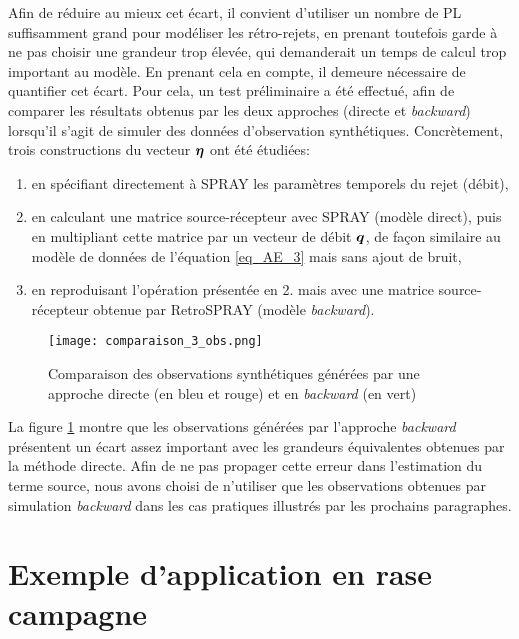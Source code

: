 Afin de réduire au mieux cet écart, il convient d'utiliser un nombre de PL suffisamment grand pour modéliser les rétro-rejets, en prenant toutefois garde à ne pas choisir une grandeur trop élevée, qui demanderait un temps de calcul trop important au modèle. En prenant cela en compte, il demeure nécessaire de quantifier cet écart. Pour cela, un test préliminaire a été effectué, afin de comparer les résultats obtenus par les deux approches (directe et \textit{backward}) lorsqu'il s'agit de simuler des données d'observation synthétiques. Concrètement, trois constructions du vecteur ${\bm{\eta}}$ ont été étudiées:

\begin{enumerate}
	\item en spécifiant directement à SPRAY les paramètres temporels du rejet (débit),
	\item en calculant une matrice source-récepteur avec SPRAY (modèle direct), puis en multipliant cette matrice par un vecteur de débit ${\bm{q}}$, de façon similaire au modèle de données de l'équation \eqref{eq_AE_3} mais sans ajout de bruit,
	\item en reproduisant l'opération présentée en 2. mais avec une matrice source-récepteur obtenue par RetroSPRAY (modèle \textit{backward}).
\end{enumerate} 

\begin{figure}[h!]
	\centering
	\texttt{[image: comparaison\_3\_obs.png]}
	\caption{Comparaison des observations synthétiques générées par une approche directe (en bleu et rouge) et en \textit{backward} (en vert)}
	\label{fig_comparaison_3_obs}
\end{figure}

La figure \ref{fig_comparaison_3_obs} montre que les observations générées par l'approche \textit{backward} présentent un écart assez important avec les grandeurs équivalentes obtenues par la méthode directe. Afin de ne pas propager cette erreur dans l'estimation du terme source, nous avons choisi de n'utiliser que les observations obtenues par simulation \textit{backward} dans les cas pratiques illustrés par les prochains paragraphes.\\




\section{Exemple d'application en rase campagne}

